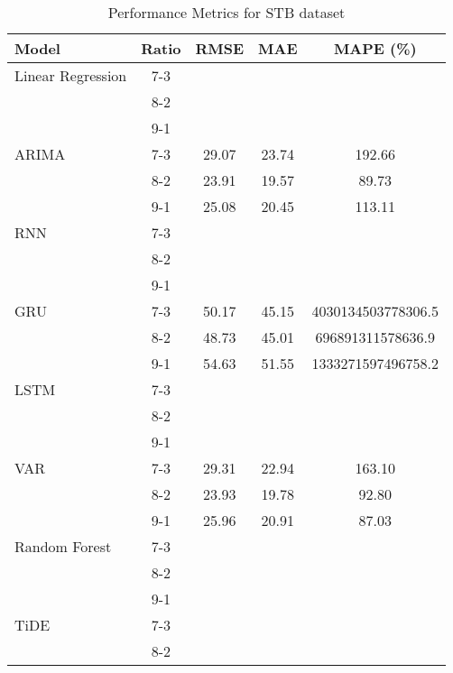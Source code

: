 \begin{table}[h!]
    \centering
    \caption{Performance Metrics for STB dataset}
    \begin{tabular}{|l|c|c|c|c|}
    \hline
    \rowcolor{orange!30} \textbf{Model} & \textbf{Ratio} & \textbf{RMSE} & \textbf{MAE} & \textbf{MAPE (\%)} \\ \hline
    \rowcolor{white} Linear Regression & 7-3 &  &  &  \\ \hline
    \rowcolor{white}  & 8-2 &  &  &  \\ \hline
    \rowcolor{white}  & 9-1 &  &  &  \\ \hline
    \rowcolor{white} ARIMA & 7-3 & 29.07 & 23.74 & 192.66 \\ \hline
    \rowcolor{white}  & 8-2 & 23.91 & 19.57 & 89.73 \\ \hline
    \rowcolor{white}  & 9-1 & 25.08 & 20.45 & 113.11 \\ \hline
    \rowcolor{white} RNN & 7-3 &  &  &  \\ \hline
    \rowcolor{white}  & 8-2 &  &  &  \\ \hline
    \rowcolor{white}  & 9-1 &  &  &  \\ \hline
    \rowcolor{white} GRU & 7-3 & 50.17 & 45.15 & 4030134503778306.5 \\ \hline
    \rowcolor{white}  & 8-2 & 48.73 & 45.01 & 696891311578636.9 \\ \hline
    \rowcolor{white}  & 9-1 & 54.63 & 51.55 & 1333271597496758.2\\ \hline
    \rowcolor{white} LSTM & 7-3 &  &  &  \\ \hline
    \rowcolor{white}  & 8-2 &  &  &  \\ \hline
    \rowcolor{white}  & 9-1 &  &  &  \\ \hline
    \rowcolor{white} VAR & 7-3 & 29.31 & 22.94 & 163.10 \\ \hline
    \rowcolor{white}  & 8-2 & 23.93 & 19.78 & 92.80 \\ \hline
    \rowcolor{white}  & 9-1 & 25.96 & 20.91 & 87.03 \\ \hline
    \rowcolor{white} Random Forest & 7-3 &  &  &  \\ \hline
    \rowcolor{white}  & 8-2 &  &  &  \\ \hline
    \rowcolor{white}  & 9-1 &  &  &  \\ \hline
    \rowcolor{green!30} TiDE & 7-3 &  &  &  \\ \hline
    \rowcolor{green!30}  & 8-2 &  &  &  \\ \hline

\end{tabular}
\end{table}

